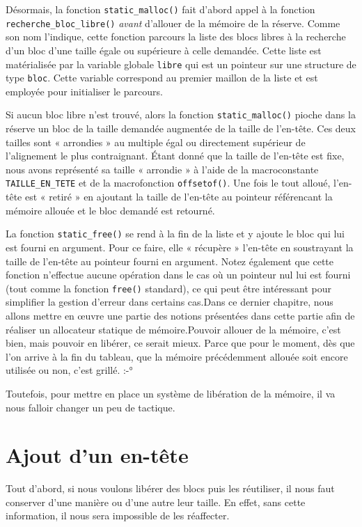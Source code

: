 \documentclass[]{article}
\begin{document}
Désormais, la fonction \texttt{static\_malloc()} fait d'abord appel à la
fonction \texttt{recherche\_bloc\_libre()} \emph{avant} d'allouer de la
mémoire de la réserve. Comme son nom l'indique, cette fonction parcours
la liste des blocs libres à la recherche d'un bloc d'une taille égale ou
supérieure à celle demandée. Cette liste est matérialisée par la
variable globale \texttt{libre} qui est un pointeur sur une structure de
type \texttt{bloc}. Cette variable correspond au premier maillon de la
liste et est employée pour initialiser le parcours.

Si aucun bloc libre n'est trouvé, alors la fonction
\texttt{static\_malloc()} pioche dans la réserve un bloc de la taille
demandée augmentée de la taille de l'en-tête. Ces deux tailles sont «
arrondies » au multiple égal ou directement supérieur de l'alignement le
plus contraignant. Étant donné que la taille de l'en-tête est fixe, nous
avons représenté sa taille « arrondie » à l'aide de la macroconstante
\texttt{TAILLE\_EN\_TETE} et de la macrofonction \texttt{offsetof()}.
Une fois le tout alloué, l'en-tête est « retiré » en ajoutant la taille
de l'en-tête au pointeur référencant la mémoire allouée et le bloc
demandé est retourné.

La fonction \texttt{static\_free()} se rend à la fin de la liste et y
ajoute le bloc qui lui est fourni en argument. Pour ce faire, elle «
récupère » l'en-tête en soustrayant la taille de l'en-tête au pointeur
fourni en argument. Notez également que cette fonction n'effectue aucune
opération dans le cas où un pointeur nul lui est fourni (tout comme la
fonction \texttt{free()} standard), ce qui peut être intéressant pour
simplifier la gestion d'erreur dans certains cas.Dans ce dernier
chapitre, nous allons mettre en œuvre une partie des notions présentées
dans cette partie afin de réaliser un allocateur statique de
mémoire.Pouvoir allouer de la mémoire, c'est bien, mais pouvoir en
libérer, ce serait mieux. Parce que pour le moment, dès que l'on arrive
à la fin du tableau, que la mémoire précédemment allouée soit encore
utilisée ou non, c'est grillé. :-°

Toutefois, pour mettre en place un système de libération de la mémoire,
il va nous falloir changer un peu de tactique.

\section{Ajout d'un en-tête}\label{ajout-dun-en-tuxeate}

Tout d'abord, si nous voulons libérer des blocs puis les réutiliser, il
nous faut conserver d'une manière ou d'une autre leur taille. En effet,
sans cette information, il nous sera impossible de les réaffecter.
\end{document}
